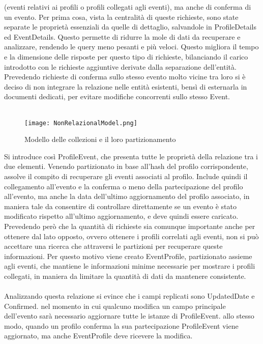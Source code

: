 (eventi relativi ai profili o profili collegati agli eventi), 
ma anche di conferma di un evento.
Per prima cosa, vista la centralità di queste richieste,
sono state separate le proprietà essenziali da quelle di dettaglio,
salvandole in ProfileDetails ed EventDetails.
Questo permette di ridurre la mole di dati da recuperare e analizzare, 
rendendo le query meno pesanti e più veloci.
Questo migliora il tempo e la dimensione delle risposte per questo tipo di richieste, 
bilanciando il carico introdotto con le richieste aggiuntive derivate dalla separazione dell'entità.
Prevedendo richieste di conferma sullo stesso evento molto vicine tra loro
si è deciso di non integrare la relazione nelle entità esistenti, 
bensì di esternarla in documenti dedicati, 
per evitare modifiche concorrenti sullo stesso Event.\\
\\
\begin{figure}[htbp]
    \centering
    \texttt{[image: NonRelazionalModel.png]}
    \caption{Modello delle collezioni e il loro partizionamento}
\end{figure}
Si introduce così ProfileEvent, 
che presenta tutte le proprietà della relazione tra i due elementi. 
Venendo partizionato in base all'hash del profilo corrispondente,
assolve il compito di recuperare gli eventi associati al profilo.
Include quindi il collegamento all'evento e
la conferma o meno della partecipazione del profilo all'evento, 
ma anche la data dell'ultimo aggiornamento del profilo associato,
in maniera tale da consentire di controllare direttamente 
se un evento è stato modificato rispetto all'ultimo aggiornamento,
e deve quindi essere caricato.
Prevedendo però che la quantità di richieste sia comunque importante 
anche per ottenere dal lato opposto, 
ovvero ottenere i profili correlati agli eventi, 
non si può accettare una ricerca che attraversi le partizioni per recuperare queste informazioni.
Per questo motivo viene creato EventProfile, 
partizionato assieme agli eventi,
che mantiene le informazioni minime necessarie per mostrare i profili collegati, 
in maniera da limitare la quantità di dati da mantenere consistente.\\
\\
Analizzando questa relazione si evince che 
i campi replicati sono UpdatedDate e Confirmed.
nel momento in cui qualcuno modifica un campo principale dell'evento sarà necessario aggiornare tutte le istanze di ProfileEvent.
allo stesso modo, quando un profilo conferma la sua partecipazione ProfileEvent viene aggiornato, 
ma anche EventProfile deve ricevere la modifica.

